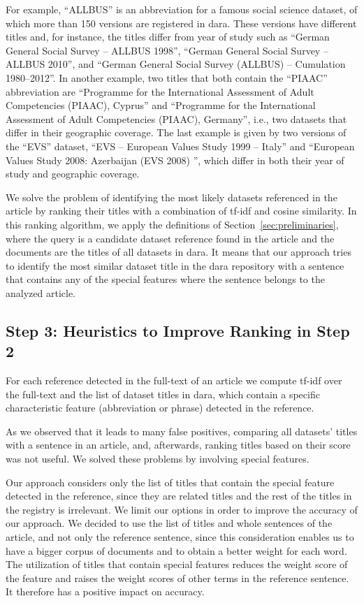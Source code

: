 \documentclass{IOS-Book-Article}
\newcommand{\dara}{\textsf{da\textbar ra}}
\begin{document}
For example, \enquote{ALLBUS} is an abbreviation for a famous social science dataset, of which more than 150 versions are registered in {\dara}.
These versions have different titles and, for instance, the titles differ from year of study such as \enquote{German General
Social Survey -- ALLBUS 1998}, 
\enquote{German General Social Survey -- ALLBUS 2010}, and \enquote{German General Social Survey (ALLBUS) -- Cumulation 1980--2012}.
In another example, two titles that both contain the \enquote{PIAAC} abbreviation are \enquote{Programme for the International Assessment of Adult Competencies (PIAAC), Cyprus} and \enquote{Programme for the International Assessment of Adult Competencies (PIAAC), Germany}, i.e., two datasets that differ in their geographic coverage.
The last example is given by two versions of the \enquote{EVS} dataset, 
\enquote{EVS -- European Values Study 1999 -- Italy} and \enquote{European Values Study 2008: Azerbaijan (EVS 2008) }, which differ in both their year of study and geographic coverage.

We solve the problem of identifying the most likely datasets referenced in the article by ranking their titles with a combination of tf-idf and cosine similarity.
In this ranking algorithm, we apply the definitions of Section~\ref{sec:preliminaries}, where the query is a candidate dataset reference found in the article and the documents are the titles of all datasets in {\dara}. 
It means that our approach tries to identify the most similar dataset title in the {\dara} repository with a sentence that contains any of the special features where the sentence belongs to the analyzed article.

\subsection{Step 3: Heuristics to Improve Ranking in Step 2}
\label{sec:heur-impr-rank}

For each reference detected in the full-text of an article we compute tf-idf over the full-text and the list of dataset titles in {\dara}, which contain a specific characteristic feature (abbreviation or phrase) detected in the reference.

As we observed that it leads to many false positives, comparing all datasets' titles with a sentence in an article, and, afterwards, ranking titles based on their score was not useful.
We solved these problems by involving special features.

Our approach considers only the list of titles that contain the special feature detected in the reference, since they are related titles and the rest of the titles in the registry is irrelevant.
We limit our options in order to improve the accuracy of our approach.
We decided to use the list of titles and whole sentences of the article, and not only the reference sentence, since this consideration enables us to have a bigger corpus of documents and to obtain a better weight for each word.
The utilization of titles that contain special features reduces the weight score of the feature and raises the weight scores of other terms in the reference sentence.
It therefore has a positive impact on accuracy.
\end{document}
